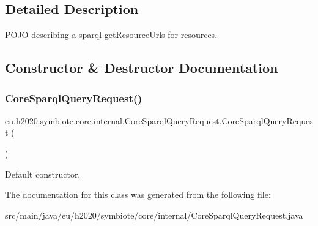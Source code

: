 \subsection{Detailed Description}
P\+O\+JO describing a sparql get\+Resource\+Urls for resources. 

\subsection{Constructor \& Destructor Documentation}
\mbox{\label{classeu_1_1h2020_1_1symbiote_1_1core_1_1internal_1_1CoreSparqlQueryRequest_a855c39c53d50de118f4df279eb2b01f3}} 
\subsubsection{\texorpdfstring{Core\+Sparql\+Query\+Request()}{CoreSparqlQueryRequest()}}
{\footnotesize\ttfamily eu.\+h2020.\+symbiote.\+core.\+internal.\+Core\+Sparql\+Query\+Request.\+Core\+Sparql\+Query\+Request (\begin{DoxyParamCaption}{ }\end{DoxyParamCaption})}

Default constructor. 

The documentation for this class was generated from the following file\+:\begin{DoxyCompactItemize}
\item 
src/main/java/eu/h2020/symbiote/core/internal/Core\+Sparql\+Query\+Request.\+java\end{DoxyCompactItemize}
